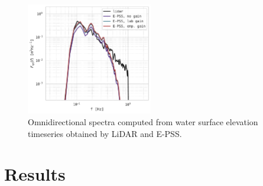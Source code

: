 \documentclass[letterpaper,journal]{IEEEtran}
\begin{document}
\begin{figure}[!ht]
    \centering
    \includegraphics[width=0.49\textwidth]{_figures/elevation_omnispect.pdf}
    \vspace{-25pt}
\caption{Omnidirectional spectra computed from water surface elevation timeseries obtained by LiDAR and E-PSS.}
\label{fig:elevation_omnispect}
\end{figure}

\newpage

\section{Results}
\label{sec:results}
\end{document}
